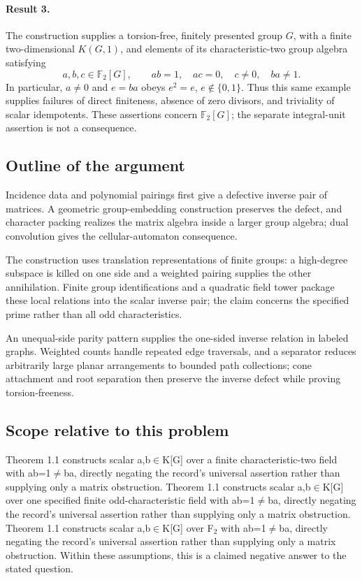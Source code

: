 \documentclass[11pt]{article}
\begin{document}
\paragraph{Result 3.} The construction supplies a torsion-free, finitely presented group \(G\), with a finite two-dimensional \(K(G,1)\), and elements of its characteristic-two group algebra satisfying
\[
 a,b,c\in\mathbb F_2[G],\qquad ab=1,\quad ac=0,\quad c\ne0,\quad ba\ne1.
\]
In particular, \(a\ne0\) and \(e=ba\) obeys \(e^2=e\), \(e\notin\{0,1\}\). Thus this same example supplies failures of direct finiteness, absence of zero divisors, and triviality of scalar idempotents. These assertions concern \(\mathbb F_2[G]\); the separate integral-unit assertion is not a consequence.

\subsection{Outline of the argument}
Incidence data and polynomial pairings first give a defective inverse pair of matrices. A geometric group-embedding construction preserves the defect, and character packing realizes the matrix algebra inside a larger group algebra; dual convolution gives the cellular-automaton consequence.

The construction uses translation representations of finite groups: a high-degree subspace is killed on one side and a weighted pairing supplies the other annihilation. Finite group identifications and a quadratic field tower package these local relations into the scalar inverse pair; the claim concerns the specified prime rather than all odd characteristics.

An unequal-side parity pattern supplies the one-sided inverse relation in labeled graphs. Weighted counts handle repeated edge traversals, and a separator reduces arbitrarily large planar arrangements to bounded path collections; cone attachment and root separation then preserve the inverse defect while proving torsion-freeness.

\subsection{Scope relative to this problem}
Theorem 1.1 constructs scalar a,b\(\in\)K[G] over a finite characteristic-two field with ab=1\(\neq\)ba, directly negating the record’s universal assertion rather than supplying only a matrix obstruction. Theorem 1.1 constructs scalar a,b\(\in\)K[G] over one specified finite odd-characteristic field with ab=1\(\neq\)ba, directly negating the record’s universal assertion rather than supplying only a matrix obstruction. Theorem 1.1 constructs scalar a,b\(\in\)K[G] over F\({}_{2}\) with ab=1\(\neq\)ba, directly negating the record’s universal assertion rather than supplying only a matrix obstruction. Within these assumptions, this is a claimed negative answer to the stated question.
\end{document}
